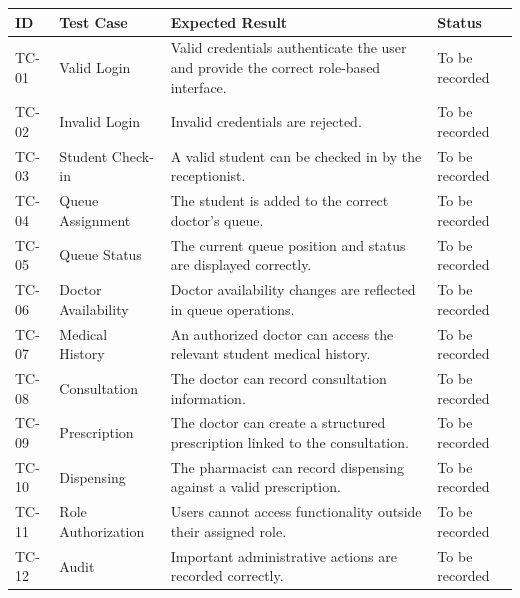 \documentclass{tietreport}
\begin{document}
\begin{longtable}{p{1.2cm}p{4.0cm}p{5.5cm}p{1.8cm}}
\toprule
\textbf{ID} &
\textbf{Test Case} &
\textbf{Expected Result} &
\textbf{Status} \\
\midrule

TC-01 &
Valid Login &
Valid credentials authenticate the user and provide the correct
role-based interface. &
To be recorded \\

TC-02 &
Invalid Login &
Invalid credentials are rejected. &
To be recorded \\

TC-03 &
Student Check-in &
A valid student can be checked in by the receptionist. &
To be recorded \\

TC-04 &
Queue Assignment &
The student is added to the correct doctor's queue. &
To be recorded \\

TC-05 &
Queue Status &
The current queue position and status are displayed correctly. &
To be recorded \\

TC-06 &
Doctor Availability &
Doctor availability changes are reflected in queue operations. &
To be recorded \\

TC-07 &
Medical History &
An authorized doctor can access the relevant student medical
history. &
To be recorded \\

TC-08 &
Consultation &
The doctor can record consultation information. &
To be recorded \\

TC-09 &
Prescription &
The doctor can create a structured prescription linked to the
consultation. &
To be recorded \\

TC-10 &
Dispensing &
The pharmacist can record dispensing against a valid prescription. &
To be recorded \\

TC-11 &
Role Authorization &
Users cannot access functionality outside their assigned role. &
To be recorded \\

TC-12 &
Audit &
Important administrative actions are recorded correctly. &
To be recorded \\

\bottomrule
\end{longtable}
\end{document}
